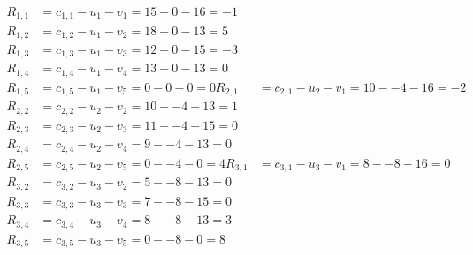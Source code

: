 \[
\begin{aligned}
R_{1,1} &= c_{1,1} - u_{1} - v_{1} = 15 - 0 - 16 = -1 \\
R_{1,2} &= c_{1,2} - u_{1} - v_{2} = 18 - 0 - 13 = 5 \\
R_{1,3} &= c_{1,3} - u_{1} - v_{3} = 12 - 0 - 15 = -3 \\
R_{1,4} &= c_{1,4} - u_{1} - v_{4} = 13 - 0 - 13 = 0 \\
R_{1,5} &= c_{1,5} - u_{1} - v_{5} = 0 - 0 - 0 = 0 
R_{2,1} &= c_{2,1} - u_{2} - v_{1} = 10 - -4 - 16 = -2 \\
R_{2,2} &= c_{2,2} - u_{2} - v_{2} = 10 - -4 - 13 = 1 \\
R_{2,3} &= c_{2,3} - u_{2} - v_{3} = 11 - -4 - 15 = 0 \\
R_{2,4} &= c_{2,4} - u_{2} - v_{4} = 9 - -4 - 13 = 0 \\
R_{2,5} &= c_{2,5} - u_{2} - v_{5} = 0 - -4 - 0 = 4 
R_{3,1} &= c_{3,1} - u_{3} - v_{1} = 8 - -8 - 16 = 0 \\
R_{3,2} &= c_{3,2} - u_{3} - v_{2} = 5 - -8 - 13 = 0 \\
R_{3,3} &= c_{3,3} - u_{3} - v_{3} = 7 - -8 - 15 = 0 \\
R_{3,4} &= c_{3,4} - u_{3} - v_{4} = 8 - -8 - 13 = 3 \\
R_{3,5} &= c_{3,5} - u_{3} - v_{5} = 0 - -8 - 0 = 8 
\end{aligned}
\]

